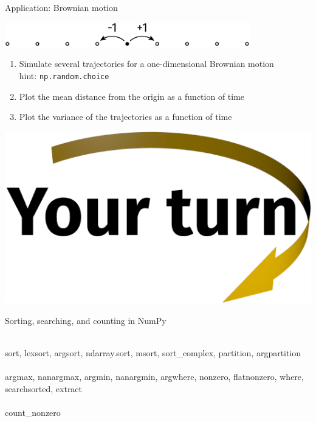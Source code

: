 \documentclass[svgnames]{beamer}
\begin{document}
\begin{frame}{Application: Brownian motion}
 \begin{center}
  \includegraphics[width=0.8\textwidth]{diffusion}
 \end{center}

 \begin{enumerate}
  \item Simulate several trajectories for a one-dimensional Brownian motion\\
        hint: \texttt{np.random.choice}
  \item Plot the mean distance from the origin as a function of time\\
  \item Plot the variance of the trajectories as a function of time
 \end{enumerate}

 \vspace{0.3truecm}
 \begin{center}
  \includegraphics[width=3truecm]{yourturn}
 \end{center}
\end{frame}

\begin{frame}{Sorting, searching, and counting in NumPy}
 
 \\
 \small{sort, lexsort, argsort, ndarray.sort, msort, sort\_complex, partition,
        argpartition}\\[0.2truecm]
 \\
 \small{argmax, nanargmax, argmin, nanargmin, argwhere, nonzero, flatnonzero,
        where, searchsorted, extract}\\[0.2truecm]
 \\
 \small{count\_nonzero}
\end{frame}
\end{document}
